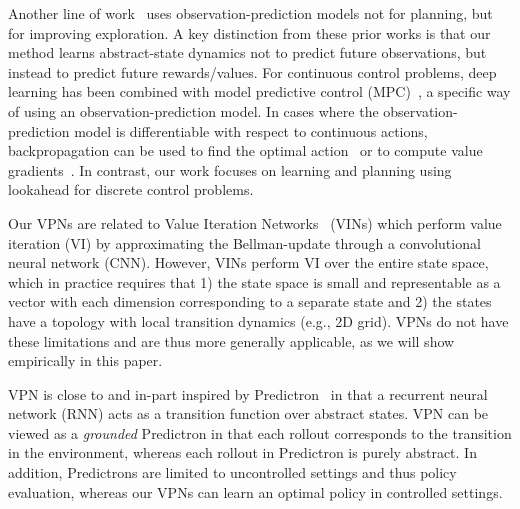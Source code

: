 \documentclass{article}
\newcommand{\obsmodel}{{observation-prediction model}}
\newcommand{\cutparagraphup}{\vspace{-2pt}}
\begin{document}
Another line of work~\cite{oh2015action,Chiappa2017RecurrentES,Guo2016DeepLF,stadie2015incentivizing} uses {\obsmodel}s not for planning, but for improving exploration. 
A key distinction from these prior works is that our method learns abstract-state dynamics not to predict  future observations, but instead to predict future rewards/values.
For continuous control problems, deep learning has been combined with model predictive control (MPC)~\cite{Finn2016DeepVF,Lenz2015DeepMPCLD,raiko2009variational}, a specific way of using an \obsmodel. 
In cases where the \obsmodel{} is differentiable with respect to continuous actions, backpropagation can be used to find the optimal action~\cite{Mishra2017PredictionAC} or to compute value gradients~\cite{Heess2015LearningCC}. In contrast, our work focuses on learning and planning using lookahead for discrete control problems.

Our VPNs are related to Value Iteration Networks~\cite{Tamar2016ValueIN} (VINs) which perform value iteration (VI) by approximating the Bellman-update through a convolutional neural network (CNN). 
However, VINs perform VI over the entire state space, which in practice requires that 1) the state space is small and representable as a vector with each dimension corresponding to a separate state and 2) the states have a topology with local transition dynamics (e.g., 2D grid). 
VPNs do not have these limitations and are thus more generally applicable, as we will show empirically in this paper. 

VPN is close to and in-part inspired by Predictron~\cite{Silver2016ThePE} in that a recurrent neural network (RNN) acts as a transition function over abstract states. VPN can be viewed as a \textit{grounded} Predictron in that each rollout corresponds to the transition in the environment, whereas each rollout in Predictron is purely abstract. In addition, Predictrons are limited to uncontrolled settings and thus policy evaluation, whereas our VPNs can learn an optimal policy in controlled settings.

\cutparagraphup
\end{document}
